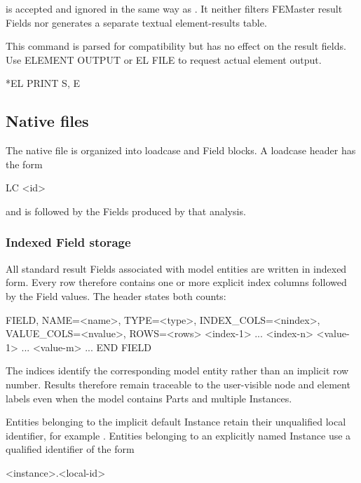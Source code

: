 
 is accepted and ignored in the same way as . It neither filters FEMaster result Fields nor generates a separate textual element-results table.

This command is parsed for compatibility but has no effect on the result fields. Use ELEMENT OUTPUT or EL FILE to request actual element output.

\exampleheading
\begin{inputdeck}
*EL PRINT
S, E
\end{inputdeck}

\subsection{Native  files}

The native  file is organized into loadcase and Field blocks. A loadcase header has the form
\begin{syntax}
LC <id>
\end{syntax}
and is followed by the Fields produced by that analysis.

\subsubsection*{Indexed Field storage}

All standard result Fields associated with model entities are written in indexed form. Every row therefore contains one or more explicit index columns followed by the Field values. The header states both counts:

\begin{syntax}
FIELD, NAME=<name>, TYPE=<type>,
INDEX_COLS=<nindex>, VALUE_COLS=<nvalue>, ROWS=<rows>
<index-1> ... <index-n> <value-1> ... <value-m>
...
END FIELD
\end{syntax}

The indices identify the corresponding model entity rather than an implicit row number. Results therefore remain traceable to the user-visible node and element labels even when the model contains Parts and multiple Instances.

Entities belonging to the implicit default Instance retain their unqualified local identifier, for example . Entities belonging to an explicitly named Instance use a qualified identifier of the form

\begin{syntax}
<instance>.<local-id>
\end{syntax}

